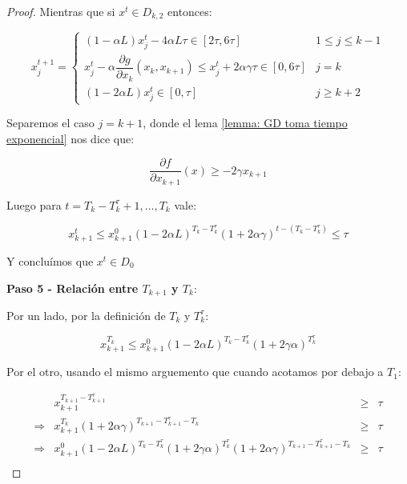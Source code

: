 \begin{proof}
	Mientras que si $x^t \in D_{k,2}$ entonces:
	
	\begin{equation*}
	x_j^{t+1} = \left\lbrace \begin{array}{cr}
	\left(1 - \alpha L\right)x_j^t - 4\alpha L \tau \in [2\tau, 6\tau] & 1 \leq j \leq k-1 \\
	x_j^t - \alpha \dfrac{\partial g}{\partial x_k} \left(x_k, x_{k+1}\right) \leq x_j^t  + 2\alpha \gamma \tau \in [0, 6\tau] & j = k \\
	\left(1 - 2\alpha L\right)x_j^t \in [0, \tau] & j \geq k+2
	\end{array}\right.
	\end{equation*}	
	
	Separemos el caso $j= k+1$, donde el lema \ref{lemma: GD toma tiempo exponencial} nos dice que:
	
	\begin{equation*}
		\dfrac{\partial f}{\partial x_{k+1}}\left(x\right) \geq -2 \gamma x_{k+1}
	\end{equation*}
	
	Luego para $t = T_k - T_k^{\tau} + 1, \dots, T_k$ vale:
	
	\begin{equation*}
		x_{k+1}^{t} \leq x_{k+1}^0 \left(1 - 2 \alpha L\right)^{T_k - T_k^{\tau}} \left(1 + 2 \alpha \gamma \right)^{t - \left(T_k - T_k^{\tau}\right)} \leq \tau
	\end{equation*}
	
	Y conclu\'imos que $x^t \in D_0$
	
	\medskip
	
	\textbf{Paso 5 - Relaci\'on entre $T_{k+1}$ y $T_k$}:
	
	\medskip
	
	Por un lado, por la definici\'on de $T_k$ y $T_k^{\tau}$:
	
	\begin{equation*}
		x_{k+1}^{T_k} \leq x_{k+1}^{0} \left(1 - 2 \alpha L\right)^{T_k - T_k^{\tau}}\left(1 + 2 \gamma \alpha\right)^{T_k^{\tau}}
	\end{equation*}
	
	Por el otro, usando el mismo arguemento que cuando acotamos por debajo a $T_1$:
	
	\begin{equation*}
	\begin{aligned}
		& x_{k+1}^{T_{k+1} - T_{k+1}^{\tau}} & \geq & \tau \\
		\Rightarrow & x_{k+1}^{T_k} \left(1 + 2 \alpha \gamma\right)^{T_{k+1} - T_{k+1}^{\tau} - T_k} & \geq & \tau \\
		\Rightarrow & x_{k+1}^{0} \left(1 - 2 \alpha L\right)^{T_k - T_k^{\tau}}\left(1 + 2 \gamma \alpha\right)^{T_k^{\tau}} \left(1 + 2 \alpha \gamma\right)^{T_{k+1} - T_{k+1}^{\tau} - T_k} & \geq & \tau \\
	\end{aligned}
	\end{equation*}
	

\end{proof}
